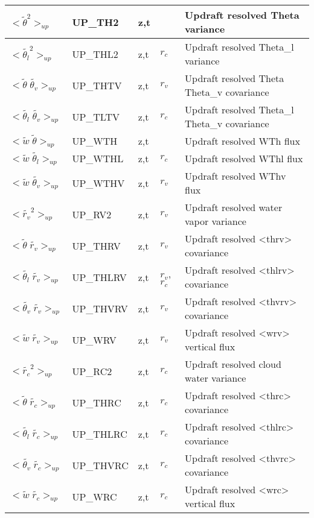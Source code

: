 \begin{longtable}[c]{|p{}|p{}|p{}|p{}|p{}|}
$<{\tilde{\theta}^2}>_{up}$                   & UP\_TH2   & z,t   &       & Updraft resolved Theta variance \\\hline
$<{\tilde{\theta_l}^2}>_{up}$                 & UP\_THL2  & z,t   & $r_c$ & Updraft resolved Theta\_l variance \\\hline
$<{\tilde{\theta}\;\tilde{\theta_v}}>_{up}$   & UP\_THTV  & z,t   & $r_v$ & Updraft resolved Theta Theta\_v covariance \\\hline
$<{\tilde{\theta_l}\;\tilde{\theta_v}}>_{up}$ & UP\_TLTV  & z,t   & $r_c$ & Updraft resolved Theta\_l Theta\_v covariance \\\hline
$<{\tilde{w}\;\tilde{\theta}}>_{up}$          & UP\_WTH   & z,t   &       & Updraft resolved WTh flux \\\hline
$<{\tilde{w}\;\tilde{\theta_l}}>_{up}$        & UP\_WTHL  & z,t   & $r_c$ & Updraft resolved WThl flux\\\hline
$<{\tilde{w}\;\tilde{\theta_v}}>_{up}$        & UP\_WTHV  & z,t   & $r_v$ & Updraft resolved WThv flux \\\hline
$<{\tilde{r_v}}^2>_{up}$                      & UP\_RV2   & z,t   & $r_v$ & Updraft resolved water vapor variance \\\hline
$<{\tilde{\theta}\;\tilde{r_v}}>_{up}$        & UP\_THRV  & z,t   & $r_v$ & Updraft resolved <thrv> covariance \\\hline
$<{\tilde{\theta_l}\;\tilde{r_v}}>_{up}$      & UP\_THLRV & z,t   & $r_v$, $r_c$ & Updraft resolved <thlrv> covariance \\\hline
$<{\tilde{\theta_v}\;\tilde{r_v}}>_{up}$      & UP\_THVRV & z,t   & $r_v$ & Updraft resolved <thvrv> covariance \\\hline
$<{\tilde{w}\;\tilde{r_v}}>_{up}$             & UP\_WRV   & z,t   & $r_v$ & Updraft resolved <wrv> vertical flux \\\hline
$<{\tilde{r_c}}^2>_{up}$                      & UP\_RC2   & z,t   & $r_c$ & Updraft resolved cloud water variance \\\hline
$<{\tilde{\theta}\;\tilde{r_c}}>_{up}$        & UP\_THRC  & z,t   & $r_c$ & Updraft resolved <thrc> covariance \\\hline
$<{\tilde{\theta_l}\;\tilde{r_c}}>_{up}$      & UP\_THLRC & z,t   & $r_c$ & Updraft resolved <thlrc> covariance \\\hline
$<{\tilde{\theta_v}\;\tilde{r_c}}>_{up}$      & UP\_THVRC & z,t   & $r_c$ & Updraft resolved <thvrc> covariance \\\hline
$<{\tilde{w}\;\tilde{r_c}}>_{up}$             & UP\_WRC   & z,t   & $r_c$ & Updraft resolved <wrc> vertical flux \\\hline

\end{longtable}
